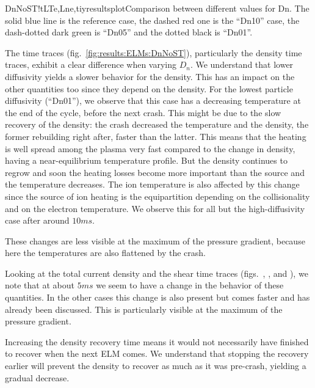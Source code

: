 \begin{AllFigs}{DnNoST}{!t}{}{LTe,Lne,ti}{y}{resultsplot}{Comparison between different values for Dn. The solid blue line is the reference case, the dashed red one is the ``Dn10'' case, the dash-dotted dark green is ``Dn05'' and the dotted black is ``Dn01''.}
\end{AllFigs}
The time traces (fig.~\ref{fig:results:ELMs:DnNoST}), particularly the density time traces, exhibit a clear difference when varying $D_n$. We understand that lower diffusivity yields a slower behavior for the density. This has an impact on the other quantities too since they depend on the density. For the lowest particle diffusivity (``Dn01''), we observe that this case has a decreasing temperature at the end of the cycle, before the next crash. This might be due to the slow recovery of the density: the crash decreased the temperature and the density, the former rebuilding right after, faster than the latter. This means that the heating is well spread among the plasma very fast compared to the change in density, having a near-equilibrium temperature profile. But the density continues to regrow and soon the heating losses become more important than the source and the temperature decreases. The ion temperature is also affected by this change since the source of ion heating is the equipartition depending on the collisionality and on the electron temperature. We observe this for all but the high-diffusivity case after around $10ms$.

These changes are less visible at the maximum of the pressure gradient, because here the temperatures are also flattened by the crash.

Looking at the total current density and the shear time traces (figs.~, ,  and ), we note that at about $5ms$ we seem to have a change in the behavior of these quantities. In the other cases this change is also present but comes faster and has already been discussed. This is particularly visible at the maximum of the pressure gradient.

Increasing the density recovery time means it would not necessarily have finished to recover when the next ELM comes. We understand that stopping the recovery earlier will prevent the density to recover as much as it was pre-crash, yielding a gradual decrease.

